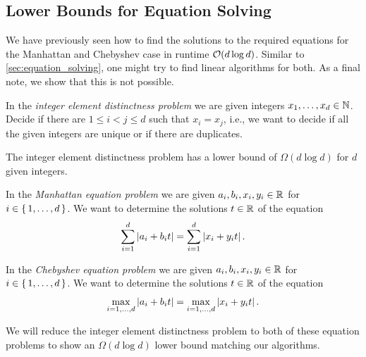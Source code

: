 \subsection{Lower Bounds for Equation Solving}
We have previously seen how to find the solutions to the required equations for the Manhattan and Chebyshev case in runtime \(\mathcal{O}(d \log d)\). Similar to \cref{sec:equation_solving}, one might try to find linear algorithms for both. As a final note, we show that this is not possible. 

\begin{definition}
  In the \emph{integer element distinctness problem} we are given integers \(x_1, \dots, x_d \in \mathbb{N}\). Decide if there are \(1 \leq i < j \leq d\) such that \(x_i = x_j\), i.e., we want to decide if all the given integers are unique or if there are duplicates.
\end{definition}

\begin{theorem}
	The integer element distinctness problem has a lower bound of \(\Omega(d \log d)\) for \(d\) given integers. 
\end{theorem}

\begin{definition}\label{def:manhattan-problem}
	In the \emph{Manhattan equation problem} we are given \(a_i, b_i, x_i, y_i \in \mathbb{R}\) for \(i \in \set{1, \dots, d}\). We want to determine the solutions \(t \in \mathbb{R}\) of the equation 
	\begin{equation}
		\sum_{i=1}^d \left|a_i + b_i t\right| = \sum_{i=1}^d \left|x_i + y_i t\right|.
	\end{equation}
\end{definition}

\begin{definition}\label{def:chebyshev-problem}
	In the \emph{Chebyshev equation problem} we are given \(a_i, b_i, x_i, y_i \in \mathbb{R}\) for \(i \in \set{1, \dots, d}\). We want to determine the solutions \(t \in \mathbb{R}\) of the equation 
	\begin{equation}
		\max_{i=1, \dots, d} \left|a_i + b_i t\right| = \max_{i=1,\dots, d} \left|x_i + y_i t\right|.
	\end{equation}
\end{definition}

We will reduce the integer element distinctness problem to both of these equation problems to show an \(\Omega(d \log d)\) lower bound matching our algorithms. 

